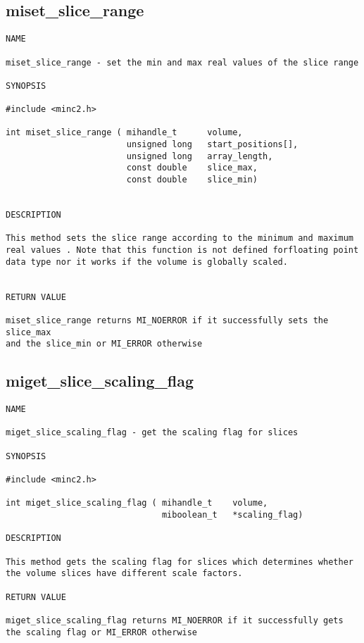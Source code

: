 \documentclass{article}
\begin{document}
\subsection{miset\_slice\_range}
\begin{verbatim}
NAME 

miset_slice_range - set the min and max real values of the slice range

SYNOPSIS

#include <minc2.h>

int miset_slice_range ( mihandle_t      volume,
                        unsigned long   start_positions[],
                        unsigned long   array_length,
                        const double    slice_max,
                        const double    slice_min)
                       
                                
DESCRIPTION

This method sets the slice range according to the minimum and maximum
real values . Note that this function is not defined forfloating point 
data type nor it works if the volume is globally scaled.


RETURN VALUE

miset_slice_range returns MI_NOERROR if it successfully sets the slice_max
and the slice_min or MI_ERROR otherwise
\end{verbatim}

\subsection{miget\_slice\_scaling\_flag}
\begin{verbatim}
NAME 

miget_slice_scaling_flag - get the scaling flag for slices

SYNOPSIS

#include <minc2.h>

int miget_slice_scaling_flag ( mihandle_t    volume,
                               miboolean_t   *scaling_flag)
                                
DESCRIPTION

This method gets the scaling flag for slices which determines whether 
the volume slices have different scale factors. 

RETURN VALUE

miget_slice_scaling_flag returns MI_NOERROR if it successfully gets 
the scaling flag or MI_ERROR otherwise
\end{verbatim}
\end{document}
